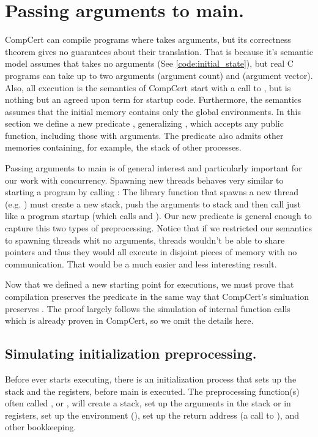 \section{Passing arguments to main.}\label{sec:premain}

CompCert can compile programs where  takes arguments, but its correctness theorem gives no guarantees about their translation. That is because it's semantic model assumes that  takes no arguments (See \ref{code:initial_state}), but real C programs can take up to two arguments  (argument count) and  (argument vector). Also, all execution is the semantics of CompCert start with a call to , but  is nothing but an agreed upon term for startup code. Furthermore, the semantics assumes that the initial memory contains only the global environments. In this section we define a new predicate , generalizing , which accepts any public function, including those with arguments. The predicate also admits other memories containing, for example, the stack of other processes. 

Passing arguments to main is of general interest and particularly important for our work with concurrency. Spawning new threads behaves very similar to starting a program by calling : The library function that spawns a new thread  (e.g. ) must create a new stack, push the arguments to stack and then call  just like a program startup (which calls  and ). Our new predicate  is general enough to capture this two types of preprocessing.
Notice that if we restricted our semantics to spawning threads whit no arguments, threads wouldn't be able to share pointers and thus they would all execute in disjoint pieces of memory with no communication. That would be a much easier and less interesting result. 

Now that we defined a new starting point for executions, we must prove that compilation preserves the predicate  in the same way that CompCert's simluation preserves . The proof largely follows the simulation of internal function calls which is already proven in CompCert, so we omit the details here. 

\subsection{Simulating initialization preprocessing.}
Before  ever starts executing, there is an initialization process that sets up the stack and the registers, before main is executed. The preprocessing function(s) often called ,  or , will create a stack, set up the arguments in the stack or in registers, set up the environment (), set up the return address (a call to ), and other bookkeeping. 


